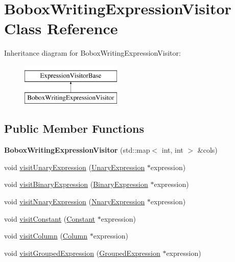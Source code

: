 \hypertarget{class_bobox_writing_expression_visitor}{\section{Bobox\+Writing\+Expression\+Visitor Class Reference}
\label{class_bobox_writing_expression_visitor}
}
Inheritance diagram for Bobox\+Writing\+Expression\+Visitor\+:\begin{figure}[H]
\begin{center}
\leavevmode
\includegraphics[height=2.000000cm]{class_bobox_writing_expression_visitor}
\end{center}
\end{figure}
\subsection*{Public Member Functions}
\begin{DoxyCompactItemize}
\item 
\hypertarget{class_bobox_writing_expression_visitor_a977d27ae446d613bc90fb6e29165504b}{{\bfseries Bobox\+Writing\+Expression\+Visitor} (std\+::map$<$ int, int $>$ \&cols)}\label{class_bobox_writing_expression_visitor_a977d27ae446d613bc90fb6e29165504b}

\item 
void \hyperlink{class_bobox_writing_expression_visitor_abf4dc22d06dd87f35f577db194b69a71}{visit\+Unary\+Expression} (\hyperlink{class_unary_expression}{Unary\+Expression} $\ast$expression)
\item 
void \hyperlink{class_bobox_writing_expression_visitor_a4e7d193e7b5d361c67a0ee0b82628120}{visit\+Binary\+Expression} (\hyperlink{class_binary_expression}{Binary\+Expression} $\ast$expression)
\item 
void \hyperlink{class_bobox_writing_expression_visitor_ac66d4abc015382d70392acc6593196c3}{visit\+Nnary\+Expression} (\hyperlink{class_nnary_expression}{Nnary\+Expression} $\ast$expression)
\item 
void \hyperlink{class_bobox_writing_expression_visitor_aa51161e2a5c08a3f5ca37901fbcc572f}{visit\+Constant} (\hyperlink{class_constant}{Constant} $\ast$expression)
\item 
void \hyperlink{class_bobox_writing_expression_visitor_a2547b638ff123190d33492ed3ce410ea}{visit\+Column} (\hyperlink{class_column}{Column} $\ast$expression)
\item 
void \hyperlink{class_bobox_writing_expression_visitor_a12180fc75d31108cf8c542513e0f1db5}{visit\+Grouped\+Expression} (\hyperlink{class_grouped_expression}{Grouped\+Expression} $\ast$expression)
\end{DoxyCompactItemize}
